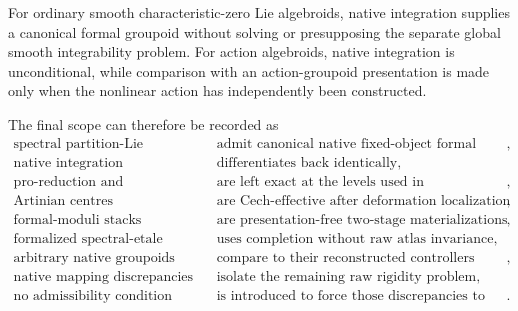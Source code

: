 For ordinary smooth characteristic-zero Lie algebroids, native integration
supplies a canonical formal groupoid without solving or presupposing the
separate global smooth integrability problem.  For action algebroids, native
integration is unconditional, while comparison with an action-groupoid
presentation is made only when the nonlinear action has independently been
constructed.

The final scope can therefore be recorded as
\[
\boxed{
\begin{aligned}
\text{spectral partition-Lie algebroids}
&\text{ admit canonical native fixed-object formal integrations},\\
\text{native integration}
&\text{ differentiates back identically},\\
\text{pro-reduction and deformation localization}
&\text{ are left exact at the levels used in materialization},\\
\text{Artinian centres}
&\text{ are Cech-effective after deformation localization},\\
\text{formal-moduli stacks}
&\text{ are presentation-free two-stage materializations},\\
\text{formalized spectral-etale transport}
&\text{ uses completion without raw atlas invariance},\\
\text{arbitrary native groupoids}
&\text{ compare to their reconstructed controllers through a canonical span},\\
\text{native mapping discrepancies}
&\text{ isolate the remaining raw rigidity problem},\\
\text{no admissibility condition}
&\text{ is introduced to force those discrepancies to vanish}.
\end{aligned}}
\]
